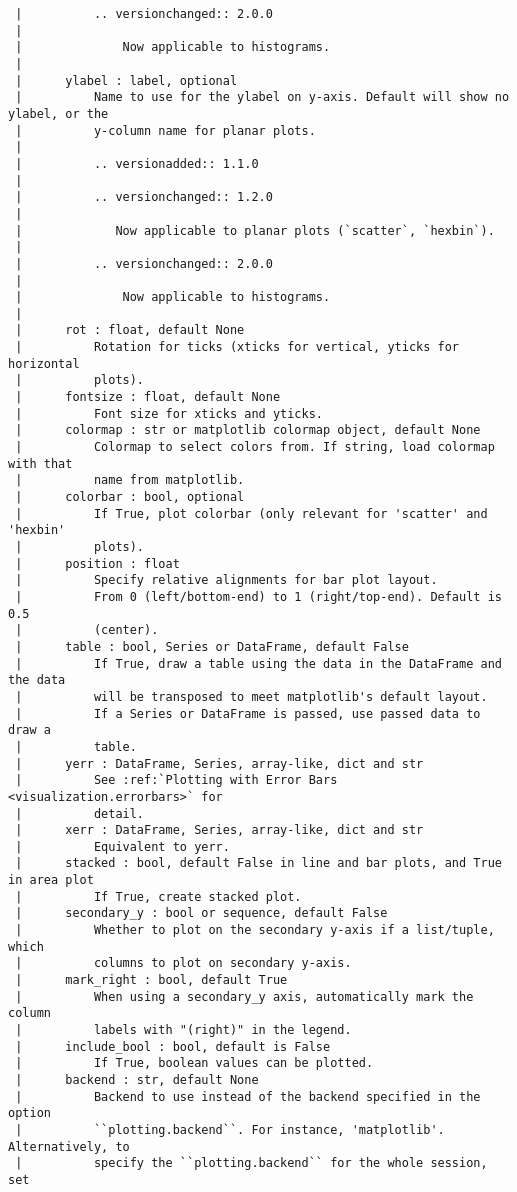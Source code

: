 \documentclass[
  letterpaper,
  DIV=11,
  numbers=noendperiod]{scrreprt}
\begin{document}
\begin{verbatim}
 |          .. versionchanged:: 2.0.0
 |      
 |              Now applicable to histograms.
 |      
 |      ylabel : label, optional
 |          Name to use for the ylabel on y-axis. Default will show no ylabel, or the
 |          y-column name for planar plots.
 |      
 |          .. versionadded:: 1.1.0
 |      
 |          .. versionchanged:: 1.2.0
 |      
 |             Now applicable to planar plots (`scatter`, `hexbin`).
 |      
 |          .. versionchanged:: 2.0.0
 |      
 |              Now applicable to histograms.
 |      
 |      rot : float, default None
 |          Rotation for ticks (xticks for vertical, yticks for horizontal
 |          plots).
 |      fontsize : float, default None
 |          Font size for xticks and yticks.
 |      colormap : str or matplotlib colormap object, default None
 |          Colormap to select colors from. If string, load colormap with that
 |          name from matplotlib.
 |      colorbar : bool, optional
 |          If True, plot colorbar (only relevant for 'scatter' and 'hexbin'
 |          plots).
 |      position : float
 |          Specify relative alignments for bar plot layout.
 |          From 0 (left/bottom-end) to 1 (right/top-end). Default is 0.5
 |          (center).
 |      table : bool, Series or DataFrame, default False
 |          If True, draw a table using the data in the DataFrame and the data
 |          will be transposed to meet matplotlib's default layout.
 |          If a Series or DataFrame is passed, use passed data to draw a
 |          table.
 |      yerr : DataFrame, Series, array-like, dict and str
 |          See :ref:`Plotting with Error Bars <visualization.errorbars>` for
 |          detail.
 |      xerr : DataFrame, Series, array-like, dict and str
 |          Equivalent to yerr.
 |      stacked : bool, default False in line and bar plots, and True in area plot
 |          If True, create stacked plot.
 |      secondary_y : bool or sequence, default False
 |          Whether to plot on the secondary y-axis if a list/tuple, which
 |          columns to plot on secondary y-axis.
 |      mark_right : bool, default True
 |          When using a secondary_y axis, automatically mark the column
 |          labels with "(right)" in the legend.
 |      include_bool : bool, default is False
 |          If True, boolean values can be plotted.
 |      backend : str, default None
 |          Backend to use instead of the backend specified in the option
 |          ``plotting.backend``. For instance, 'matplotlib'. Alternatively, to
 |          specify the ``plotting.backend`` for the whole session, set

\end{verbatim}
\end{document}
